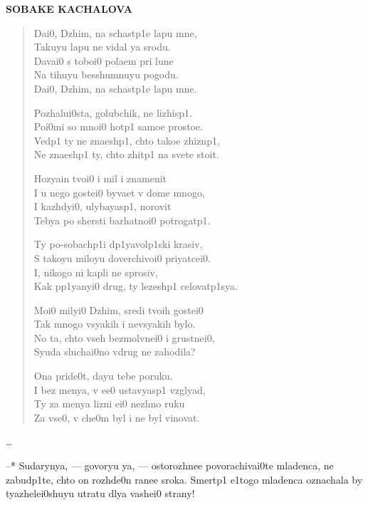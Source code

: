 \documentclass[russian,english]{book}
\begin{document}
\centerline{\bfseries SOBAKE KACHALOVA}
\begin{verse}%
Dai0, Dzhim, na schastp1e lapu mne,\\
Takuyu lapu ne vidal ya srodu.\\
Davai0 s toboi0 polaem pri lune\\
Na tihuyu besshumnuyu pogodu.\\
Dai0, Dzhim, na schastp1e lapu mne.
\bigskip

Pozhalui0sta, golubchik, ne lizhisp1.\\
Poi0mi so mnoi0 hotp1 samoe prostoe.\\
Vedp1 ty ne znaeshp1, chto takoe zhiznp1,\\
Ne znaeshp1 ty, chto zhitp1 na svete stoit.
\bigskip

Hozyain tvoi0 i mil i znamenit\\
I u nego gostei0 byvaet v dome mnogo,\\
I kazhdyi0, ulybayasp1, norovit\\
Tebya po shersti barhatnoi0 potrogatp1.
\bigskip

Ty po-sobachp1i dp1yavolp1ski krasiv,\\
S takoyu miloyu doverchivoi0 priyatcei0.\\
I, nikogo ni kapli ne sprosiv,\\
Kak pp1yanyi0 drug, ty lezeshp1 celovatp1sya.
\bigskip

Moi0 milyi0 Dzhim, sredi tvoih gostei0\\
Tak mnogo vsyakih i nevsyakih bylo.\\
No ta, chto vseh bezmolvnei0 i grustnei0,\\
Syuda sluchai0no vdrug ne zahodila?
\bigskip

Ona pride0t, dayu tebe poruku.\\
I bez menya, v ee0 ustavyasp1 vzglyad,\\
Ty za menya lizni ei0 nezhno ruku\\
Za vse0, v che0m byl i ne byl vinovat.
\bigskip

\end{verse}

\newpage
{}

\selectfont

\ldots

\cdash--* Sudarynya, \cdash--- govoryu ya, \cdash--- ostorozhnee povorachivai0te mladenca, ne zabudp1te, chto on rozhde0n ranee sroka. Smertp1 e1togo mladenca oznachala by tyazhelei0shuyu utratu dlya vashei0 strany!
\end{document}

